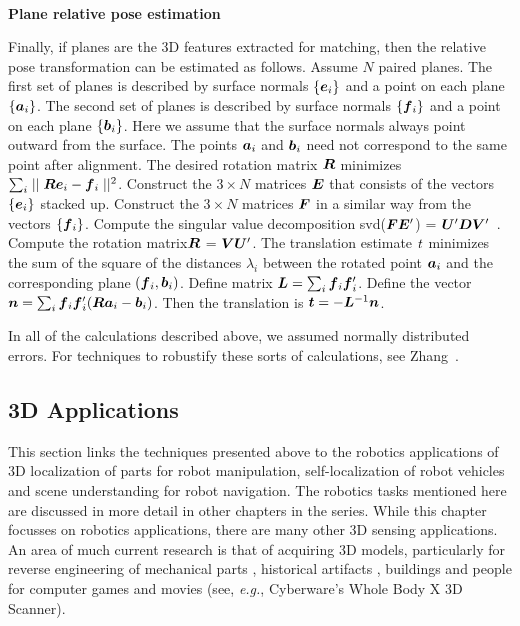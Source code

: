 \documentclass[twocolumn,oneside]{book}
\newcommand{\V}[1]{\vector{#1}}  %
\newcommand{\M}[1]{\V{#1}}    %
\begin{document}
\ \\
\noindent
{\bf Plane relative pose estimation}

Finally, if planes are the 3D features extracted for matching, then
the relative pose transformation can be estimated as follows.  Assume
$N$ paired planes.  The first set of planes is described by surface
normals $\{ \V e_i \}$ and a point on each plane $\{\V a_i\}$.  The
second set of planes is described by surface normals $\{ \V f_i\}$ and
a point on each plane $\{ \V b_i\}$.  Here we assume that the surface
normals always point outward from the surface. The points $\V a_i$ and
$\V b_i$ need not correspond to the same point after alignment.  The
desired rotation matrix $\M R$ minimizes $\sum_i \mid\mid \M R \V e_i
- \V f_i \mid\mid^2$. Construct the $3 \times N$ matrices $\M E$ that
consists of the vectors $\{ \V e_i \}$ stacked up.  Construct the $3
\times N$ matrices $\M F$ in a similar way from the vectors $\{ \V f_i
\}$. Compute the singular value decomposition svd($ \M F \M E'$) = $\M
U' \M D \M V'$~\cite{arun}. Compute the rotation
matrix\footnotemark[1] $\M R$ = $\M V \M U'$.  The translation
estimate ${\bf \it t}$ minimizes the sum of the square of the
distances $\lambda_i$ between the rotated point $\V a_i$ and the
corresponding plane $(\V f_i, \V b_i)$. Define matrix $\M L = \sum_i
\V f_i \V f_i'$.  Define the vector $\V n= \sum_i \V f_i \V f_i' (\M R
\V a_i - \V b_i)$. Then the translation is $\V t= - \M L^{-1}\V n$.

In all of the calculations described above, we assumed normally distributed
errors. For techniques to robustify these sorts of calculations, see
Zhang~\cite{zhang}.

\subsection{3D Applications \label{3dapp}}

This section links the techniques presented above to the robotics applications
of 3D localization of parts for
robot manipulation, self-localization of robot vehicles and
scene understanding for robot navigation.
The robotics tasks mentioned here are discussed in more detail
in other chapters in the series.
While this chapter focusses on robotics applications, there are
many other 3D sensing applications. An area of much current research is
that of acquiring 3D models, particularly for reverse engineering of
mechanical parts \cite{benko},
historical artifacts \cite{levoy},
buildings \cite{stamos} and
people for computer games and movies (see, {\it e.g.}, Cyberware's Whole Body X 3D Scanner).
\end{document}
